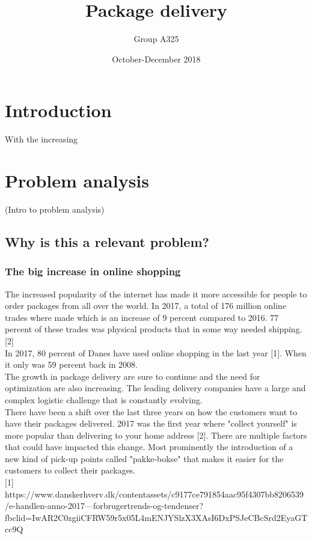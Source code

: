 \documentclass[12pt]{report}
\title{Package delivery}
\author{Group A325}
\date{October-December 2018}
\begin{document}
\maketitle
\chapter{Introduction}
With the increasing 


\chapter{Problem analysis}
(Intro to problem analysis)

\section{Why is this a relevant problem?}

\subsection{The big increase in online shopping}
The increased popularity of the internet has made it more accessible for people to order packages from all over the world. In 2017, a total of 176 million online trades where made which is an increase of 9 percent compared to 2016. 77 percent of these trades was physical products that in some way needed shipping.[2] \\
In 2017, 80 percent of Danes have used online shopping in the last year [1]. When it only was 59 percent back in 2008. \\
The growth in package delivery are sure to continue and the need for optimization are also increasing. The leading delivery companies have a large and complex logistic challenge that is constantly evolving. \\
There have been a shift over the last three years on how the customers want to have their packages delivered. 2017 was the first year where "collect yourself" is more popular than delivering to your home address [2]. There are multiple factors that could have impacted this change. Most prominently the introduction of a new kind of pick-up points called "pakke-bokse" that makes it easier for the customers to collect their packages. \\


[1] https://www.danskerhverv.dk/contentassets/c9177ce791854aac95f4307bb8206539/e-handlen-anno-2017---forbrugertrends-og-tendenser?fbclid=IwAR2C0zgiiCFRW59r5x05L4mENJYSlzX3XAsI6DxPSJeCBcSrd2EyaGTcc9Q
\end{document}

